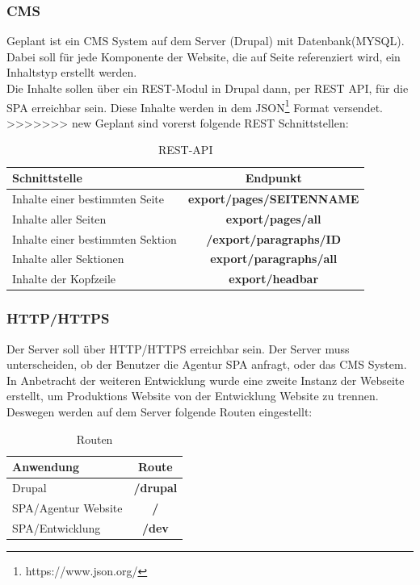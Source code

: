 \documentclass[11pt,a4paper]{article}
\begin{document}
\subsubsection{CMS}
Geplant ist ein CMS System auf dem Server (Drupal) mit Datenbank(MYSQL).\\ Dabei soll für jede Komponente der Website, die auf Seite \pageref{sec:epage}
referenziert wird, ein Inhaltstyp erstellt werden.\\
Die Inhalte sollen über ein REST-Modul in Drupal dann, per REST \acs{API}, für die SPA erreichbar sein.
Diese Inhalte werden in dem JSON\footnote{https://www.json.org/} Format versendet. 
>>>>>>> new
Geplant sind vorerst folgende REST Schnittstellen:
\begin{table}[!ht]
  \centering
     \begin{tabular}{l|c}
       \textbf{Schnittstelle}  & \textbf{Endpunkt} \\
       \hline
       Inhalte einer bestimmten Seite & \textbf{export/pages/SEITENNAME} \\
       Inhalte aller Seiten & \textbf{export/pages/all} \\
       Inhalte einer bestimmten Sektion & \textbf{/export/paragraphs/ID} \\
       Inhalte aller Sektionen & \textbf{export/paragraphs/all}\\
       Inhalte der Kopfzeile & \textbf{export/headbar}\\
     \end{tabular}
\caption{REST-API}
\end{table}
\subsubsection{HTTP/HTTPS}
Der Server soll über HTTP/HTTPS erreichbar sein. Der Server muss unterscheiden, ob der Benutzer die Agentur SPA anfragt, oder das CMS System. In Anbetracht der weiteren Entwicklung wurde eine zweite Instanz der Webseite erstellt, um Produktions Website von der Entwicklung Website zu trennen. Deswegen werden auf dem Server folgende Routen eingestellt:
\begin{table}[!ht]
  \centering
     \begin{tabular}{l|c}
       \textbf{Anwendung}  & \textbf{Route} \\
       \hline
       Drupal & \textbf{/drupal}\\
       SPA/Agentur Website & \textbf{/}\\
       SPA/Entwicklung & \textbf{/dev}\\
     \end{tabular}
\caption{Routen}
\end{table}
\end{document}
